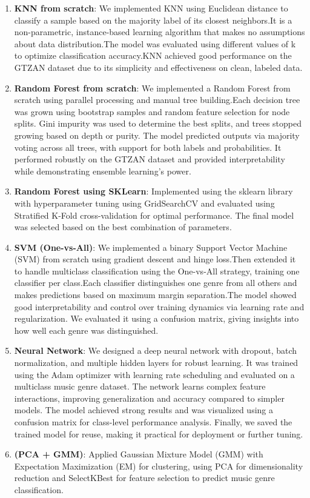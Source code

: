 \documentclass[a4paper]{article}
\theoremstyle{plain}
\theoremstyle{definition}
\begin{document}
\begin{enumerate}
    \item \textbf{KNN from scratch}: We implemented KNN using Euclidean distance to classify a sample based on the majority label of its closest neighbors.It is a non-parametric, instance-based learning algorithm that makes no assumptions about data distribution.The model was evaluated using different values of k to optimize classification accuracy.KNN achieved good performance on the GTZAN dataset due to its simplicity and effectiveness on clean, labeled data.
    \item \textbf{Random Forest from scratch}: We implemented a Random Forest from scratch using parallel processing and manual tree building.Each decision tree was grown using bootstrap samples and random feature selection for node splits. Gini impurity was used to determine the best splits, and trees stopped growing based on depth or purity. The model predicted outputs via majority voting across all trees, with support for both labels and probabilities. It performed robustly on the GTZAN dataset and provided interpretability while demonstrating ensemble learning's power.
    \item \textbf{Random Forest using SKLearn}: Implemented using the sklearn library with hyperparameter tuning using GridSearchCV and evaluated using Stratified K-Fold cross-validation for optimal performance. The final model was selected based on the best combination of parameters.
    \item \textbf{SVM (One-vs-All)}: We implemented a binary Support Vector Machine (SVM) from scratch using gradient descent and hinge loss.Then extended it to handle multiclass classification using the One-vs-All strategy, training one classifier per class.Each classifier distinguishes one genre from all others and makes predictions based on maximum margin separation.The model showed good interpretability and control over training dynamics via learning rate and regularization. We evaluated it using a confusion matrix, giving insights into how well each genre was distinguished.
    \item \textbf{Neural Network}: We designed a deep neural network with dropout, batch normalization, and multiple hidden layers for robust learning. It was trained using the Adam optimizer with learning rate scheduling and evaluated on a multiclass music genre dataset. The network learns complex feature interactions, improving generalization and accuracy compared to simpler models. The model achieved strong results and was visualized using a confusion matrix for class-level performance analysis. Finally, we saved the trained model for reuse, making it practical for deployment or further tuning.
    \item \textbf{(PCA + GMM)}: Applied Gaussian Mixture Model (GMM) with Expectation Maximization (EM) for clustering, using PCA for dimensionality reduction and SelectKBest for feature selection to predict music genre classification.
\end{enumerate}
\end{document}
